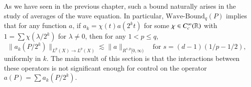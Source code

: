 As we have seen in the previous chapter, such a bound naturally arises in the study of averages of the wave equation. In particular, $\text{Wave-Bound}_q(P)$ implies that for any function $a$, if $a_k = \chi(t) a(2^k t)$ for some $\chi \in C_c^\infty(\operatorname{\mathbb{R}})$ with $1 = \sum \chi(\lambda/2^k)$ for $\lambda \neq 0$, then for any $1 < p \leq q$,
%
\begin{equation}
    \| a_k(P/2^k) \|_{L^p(X) \to L^p(X)} \lesssim \| a \|_{R^{s,p}[0,\infty)} \quad\text{for $s = (d-1)(1/p - 1/2)$},
\end{equation}
%
uniformly in $k$. The main result of this section is that the interactions between these operators is not significant enough for control on the operator $a(P) = \sum a_k(P/2^k)$.

\thmatomicscalestheorem*


